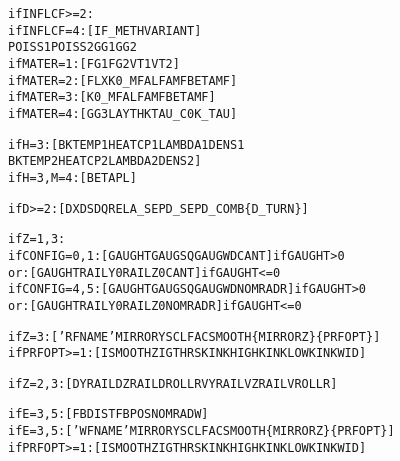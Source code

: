\documentclass[12pt]{report}
\renewcommand{\magenta}[1]{}
\begin{document}
\begin{alltt}
% Information needed for influence coefficients,
% particularly the material parameters (section \ref{sec:matcns}):

if INFLCF>=2:
      if INFLCF=4: [ IF\_METH  VARIANT               ]
                     POISS1  POISS2  GG1     GG2
\magenta{      if BOUND =1: [ FLXZ                           ]
}      if MATER =1: [ FG1     FG2       VT1     VT2  ]
      if MATER =2: [ FLX     K0\_MF   ALFAMF  BETAMF ]
      if MATER =3: [         K0\_MF   ALFAMF  BETAMF ]
      if MATER =4: [ GG3     LAYTHK  TAU\_C0  K\_TAU  ]

% Material parameters for \magenta{damping and }temperature calculation (section \ref{sec:matcns}):

\magenta{if M2=2:     [ CDAMPN   CDAMPT   DFNMAX   DFTMAX   ]
}if H=3:      [ BKTEMP1  HEATCP1  LAMBDA1  DENS1           
               BKTEMP2  HEATCP2  LAMBDA2  DENS2    ]
if H=3, M=4: [ BETAPL                              ]

% Information needed for the grid discretization (section \ref{sec:wr_potcon}):

if D>=2:     [ DX    DS   DQREL   A\_SEP   D\_SEP   D\_COMB  \{D\_TURN\} ]

% Information on the track geometry (section \ref{sec:track_geom}) \& rail profile (section \ref{sec:profiles}):

if Z=1,3:
      if CONFIG=0,1:  [  GAUGHT    GAUGSQ   GAUGWD   CANT     ]  if GAUGHT >  0
                 or:  [  GAUGHT    RAILY0   RAILZ0   CANT     ]  if GAUGHT <= 0
      if CONFIG=4,5:  [  GAUGHT    GAUGSQ   GAUGWD   NOMRADR  ]  if GAUGHT >  0
                 or:  [  GAUGHT    RAILY0   RAILZ0   NOMRADR  ]  if GAUGHT <= 0

if Z=3:        [ 'RFNAME'  MIRRORY  SCLFAC    SMOOTH  \{MIRRORZ\}  \{PRFOPT\} ]
if PRFOPT>=1:  [  ISMOOTH  ZIGTHRS  KINKHIGH  KINKLOW  KINKWID ]
\magenta{if PRFOPT>=2:  [  ERRHND   MAXOMIT  ]}
if Z=2,3:      [  DYRAIL   DZRAIL   DROLLR    VYRAIL   VZRAIL   VROLLR  ]
\magenta{if Z=2,3, F=3: [  KYRAIL   FYRAIL   KZRAIL    FZRAIL                    ]}

% Information on wheelset geometry (section \ref{sec:wheelset_geom}) \& wheel profile (section \ref{sec:profiles}):

if E=3,5:      [  FBDIST   FBPOS     NOMRADW   ] 
if E=3,5:      [ 'WFNAME'  MIRRORY   SCLFAC    SMOOTH  \{MIRRORZ\}  \{PRFOPT\} ]
if PRFOPT>=1:  [  ISMOOTH  ZIGTHRS   KINKHIGH  KINKLOW  KINKWID ]
\magenta{if PRFOPT>=2:  [  ERRHND   MAXOMIT  ]}


\end{alltt}
\end{document}

